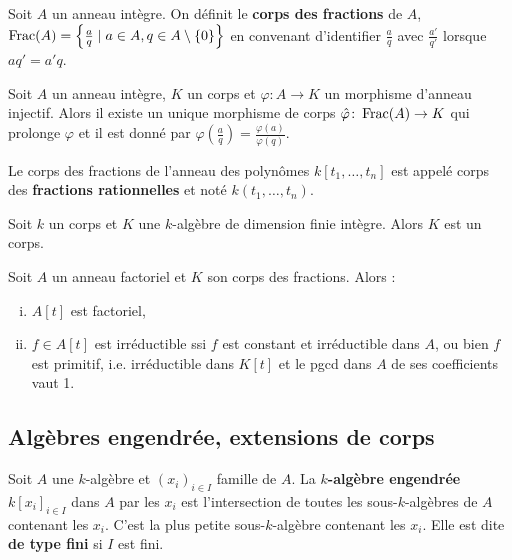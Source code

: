 	\begin{defn}
		Soit $A$ un anneau intègre.
		On définit le \textbf{corps des fractions} de $A$, $\operatorname{Frac}(A) = \left\{ \frac{a}{q} \mid a \in A, q \in A \setminus \{ 0 \} \right\}$ en convenant d'identifier $\frac{a}{q}$ avec $\frac{a'}{q'}$ lorsque $aq' = a'q$.
	\end{defn}

	\begin{pop}
		Soit $A$ un anneau intègre, $K$ un corps et $\varphi \colon A \to K$ un morphisme d'anneau injectif.
		Alors il existe un unique morphisme de corps $\hat{\varphi} \colon \operatorname{Frac}(A) \to K$ qui prolonge $\varphi$ et il est donné par $\hat{\varphi} \left( \frac{a}{q} \right) = \frac{\varphi(a)}{\varphi(q)}$.
	\end{pop}

	\begin{defn}
		Le corps des fractions de l'anneau des polynômes $k[t_1,\ldots,t_n]$ est appelé corps des \textbf{fractions rationnelles} et noté $k(t_1,\ldots,t_n)$.
	\end{defn}

	\begin{pop}
		Soit $k$ un corps et $K$ une $k$-algèbre de dimension finie intègre.
		Alors $K$ est un corps.
	\end{pop}

	\begin{lem}
		Soit $A$ un anneau factoriel et $K$ son corps des fractions.
		Alors :
		\begin{enumerate}[(i)]
			\item $A[t]$ est factoriel,
			\item $f \in A[t]$ est irréductible ssi $f$ est constant et irréductible dans $A$, ou bien $f$ est primitif, i.e. irréductible dans $K[t]$ et le pgcd dans $A$ de ses coefficients vaut 1.
		\end{enumerate}
	\end{lem}


\subsection{Algèbres engendrée, extensions de corps}

	\begin{defn}
		Soit $A$ une $k$-algèbre et $(x_i)_{i \in I}$ famille de $A$.
		La \textbf{$k$-algèbre engendrée} $k[x_i]_{i \in I}$ dans $A$ par les $x_i$ est l'intersection de toutes les sous-$k$-algèbres de $A$ contenant les $x_i$.
		C'est la plus petite sous-$k$-algèbre contenant les $x_i$.
		Elle est dite \textbf{de type fini} si $I$ est fini.
	\end{defn}

